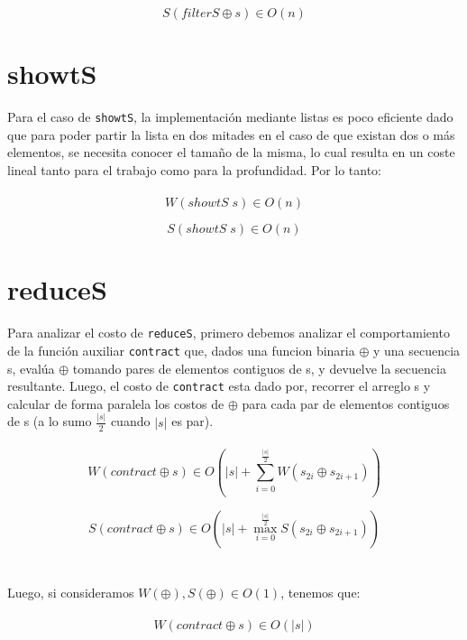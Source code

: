 \documentclass[a4paper,10pt]{article}
\begin{document}
		\begin{equation*}
			S\left( filterS \oplus s \right) \in O\left( n \right)
		\end{equation*}		
		 	
	\section*{\Large showtS}
		Para el caso de \texttt{showtS}, la implementación mediante listas es poco eficiente dado que para poder partir la lista
		en dos mitades en el caso de que existan dos o más elementos, se necesita conocer el tamaño de la misma, lo cual resulta en un
		coste lineal tanto para el trabajo como para la profundidad. Por lo tanto:
\\
\\
		\begin{equation*}
			W\left( showtS \; s \right) \in O\left( n \right)
		\end{equation*}		
		
		\begin{equation*}
			S\left( showtS \; s \right) \in O\left( n \right)
		\end{equation*}	
\pagebreak

	\section*{\Large reduceS}
		Para analizar el costo de \texttt{reduceS}, primero debemos analizar el comportamiento de la función auxiliar \texttt{contract} que, dados una funcion binaria $\oplus$ y una secuencia s, evalúa $\oplus$ tomando pares de elementos contiguos de s, y devuelve la secuencia resultante.
		Luego, el costo de \texttt{contract} esta dado por, recorrer el arreglo s y calcular de forma paralela los costos de $\oplus$ para cada par de elementos contiguos de s (a lo sumo $\frac{\vert s\vert}{2}$ cuando $\vert s\vert$ es par).
\\
\\
		\begin{equation*}
			W \left( contract \oplus s \right) \in O \left( \vert s \vert + \sum_{i=0}^{\frac{\vert s\vert}{2}} W \left( s_{2i} \oplus s_{2i+1} \right) \right)
		\end{equation*}

		\begin{equation*}
			S \left( contract \oplus s \right) \in O \left( \vert s \vert + \max_{i=0}^{\frac{\vert s \vert}{2}} S \left( s_{2i} \oplus s_{2i+1} \right) \right)
		\end{equation*}
\\
\\		
		Luego, si consideramos $W(\oplus), S(\oplus) \in O(1)$, tenemos que:
\\
\\		
		\begin{equation*}
			W \left( contract \oplus s \right) \in O \left( \vert s \vert \right)
		\end{equation*}
		
\end{document}
